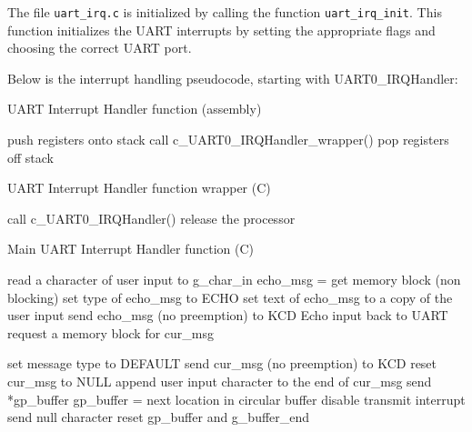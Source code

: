 \documentclass[12pt]{report}
\begin{document}
The file \texttt{uart_irq.c} is initialized by calling the function \texttt{uart_irq_init}. This function initializes the UART interrupts by setting the appropriate flags and choosing the correct UART port.

Below is the interrupt handling pseudocode, starting with UART0_IRQHandler:
\begin{algorithm}[H]
	\caption{UART Interrupt Handler function (assembly)}
	\begin{algorithmic}[1]
	    \State push registers onto stack
	    \State call c_UART0_IRQHandler_wrapper()
	    \State pop registers off stack
	  \EndFunction
	\end{algorithmic}
\end{algorithm}

\begin{algorithm}[H]
	\caption{UART Interrupt Handler function wrapper (C)}
	\begin{algorithmic}[1]
	    \State call c_UART0_IRQHandler()
	      \State release the processor
	    \EndIf
	  \EndFunction
	\end{algorithmic}
\end{algorithm}

\begin{algorithm}[H]
	\caption{Main UART Interrupt Handler function (C)}
	\begin{algorithmic}[1]
	      \State read a character of user input to g_char_in
	        \State\Return
	      \EndIf
	      \State echo_msg = get memory block (non blocking)
	        \State set type of echo_msg to ECHO
	        \State set text of echo_msg to a copy of the user input
	        \State send echo_msg (no preemption) to KCD \Comment Echo input back to UART
	      \EndIf
	        \State request a memory block for cur_msg
	          \State\Return
	        \EndIf
	      \EndIf

	        \State set message type to DEFAULT
	        \State send cur_msg (no preemption) to KCD
	        \State reset cur_msg to NULL
	      \Else
	        \State append user input character to the end of cur_msg
	      \EndIf
	        \State send *gp_buffer
	        \State gp_buffer = next location in circular buffer
	      \Else
	        \State disable transmit interrupt
	        \State send null character
	        \State reset gp_buffer and g_buffer_end
	      \EndIf
	    \EndIf
	  \EndFunction
	\end{algorithmic}
\end{algorithm}
\end{document}
